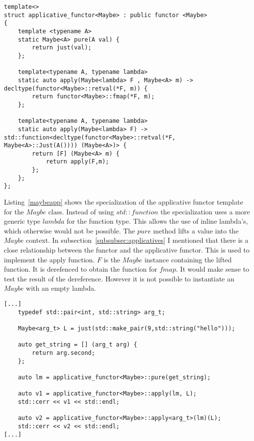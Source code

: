 \documentclass[12pt,fleqn]{article}
\begin{document}
%
%
\begin{minipage}{\linewidth}
\begin{lstlisting}[caption=Maybe applicative functor, label=maybeapp ]
template<>
struct applicative_functor<Maybe> : public functor <Maybe>
{
	template <typename A> 
	static Maybe<A> pure(A val) {
		return just(val);
	};
	
	template<typename A, typename lambda>
	static auto apply(Maybe<lambda> F , Maybe<A> m) -> decltype(functor<Maybe>::retval(*F, m)) { 
		return functor<Maybe>::fmap(*F, m);
	};

	template<typename A, typename lambda>
	static auto apply(Maybe<lambda> F) -> std::function<decltype(functor<Maybe>::retval(*F, Maybe<A>::Just(A()))) (Maybe<A>)> {
		return [F] (Maybe<A> m) {
			return apply(F,m);
		};
	};
};
\end{lstlisting}
\end{minipage}
%
%
%
%
Listing~\ref{maybeapp} shows the specialization of the applicative functor template for the $Maybe$ class.
Instead of using $std::function$ the specialization uses a more generic type $lambda$ for the function type.
This allows the use of inline lambda's, which otherwise would not be possible.
The $pure$ method lifts a value into the $Maybe$ context.
In subsection~\ref{subsubsec:applicatives} I mentioned that there is a close relationship between the functor and the applicative functor.
This is used to implement the apply function. $F$ is the $Maybe$ instance containing the lifted function. 
It is derefenced to obtain the function for $fmap$.
It would make sense to test the result of the dereference. However it is not possible to instantiate an $Maybe$ with an empty lambda. 

%
%
\begin{minipage}{\linewidth}
\begin{lstlisting}[caption=example of the maybe applicative, label=maybe_app_example]
[...]
	typedef std::pair<int, std::string> arg_t;

	Maybe<arg_t> L = just(std::make_pair(9,std::string("hello")));

	auto get_string = [] (arg_t arg) {
		return arg.second;
	};

	auto lm = applicative_functor<Maybe>::pure(get_string);

	auto v1 = applicative_functor<Maybe>::apply(lm, L);
	std::cerr << v1 << std::endl;

	auto v2 = applicative_functor<Maybe>::apply<arg_t>(lm)(L);
	std::cerr << v2 << std::endl;
[...]
\end{lstlisting}
\end{minipage}
%
%
%
\end{document}
